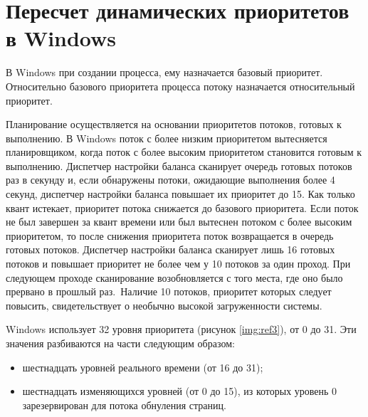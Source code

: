 \documentclass[a4paper,oneside,14pt]{extreport}
\begin{document}
\section*{Пересчет динамических приоритетов в Windows}

В Windows при создании процесса, ему назначается базовый приоритет.
Относительно базового приоритета процесса потоку назначается относительный приоритет. \cite{WINDOWS}

Планирование осуществляется на основании приоритетов потоков, готовых к выполнению.
В Windows поток с более низким приоритетом вытесняется планировщиком, когда поток 
с более высоким приоритетом становится готовым к выполнению.
Диспетчер настройки баланса сканирует очередь готовых потоков раз в секунду и,
если обнаружены потоки, ожидающие выполнения более 4
секунд, диспетчер настройки баланса повышает их приоритет до 15. 
Как только квант истекает, приоритет потока снижается до базового приоритета.
Если поток не был завершен за квант времени или был вытеснен потоком с более высоким приоритетом, то после снижения приоритета поток
возвращается в очередь готовых потоков. 
Диспетчер настройки баланса сканирует лишь 16 готовых потоков
и повышает приоритет не более чем у 10 потоков за один проход.
При следующем проходе сканирование возобновляется
с того места, где оно было прервано в прошлый раз.\
Наличие 10 потоков, приоритет которых следует повысить,
свидетельствует о необычно высокой загруженности системы.

Windows использует 32 уровня приоритета (рисунок \ref{img:ref3}), от 0 до 31. Эти значения
разбиваются на части следующим образом:

\begin{itemize}
	\item шестнадцать уровней реального времени (от 16 до 31);
	\item шестнадцать изменяющихся уровней (от 0 до 15), из которых
	уровень 0 зарезервирован для потока обнуления страниц.
\end{itemize}


\begin{figure}[ht!]
\end{figure}
\end{document}
